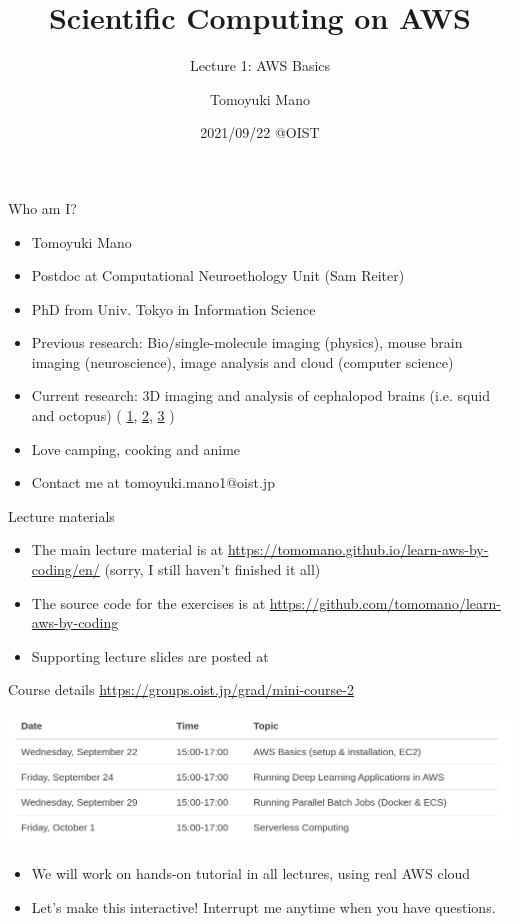 \documentclass[unicode,11pt]{beamer}
\title{Scientific Computing on AWS}
\subtitle{Lecture 1: AWS Basics}
\author{Tomoyuki Mano}
\institute[OIST]{Okinawa Institute of Science and Technology}
\date{2021/09/22 @OIST}
\begin{document}
\frame{\titlepage}

\begin{frame}{Who am I?}

\begin{itemize}
    \item Tomoyuki Mano
    \item Postdoc at Computational Neuroethology Unit (Sam Reiter)
    \item PhD from Univ. Tokyo in Information Science
    \item Previous research: Bio/single-molecule imaging (physics), mouse brain imaging (neuroscience), image analysis and cloud (computer science)
    \item Current research: 3D imaging and analysis of cephalopod brains (i.e. squid and octopus)
    (
    \href{https://twitter.com/CephWarden/status/1142083856893263872}{1},
    \href{https://twitter.com/CephWarden/status/1384644335069667334}{2},
    \href{https://twitter.com/CephWarden/status/1232307456346181632}{3}
    )
    \item Love camping, cooking and anime
    \item Contact me at tomoyuki.mano1@oist.jp
\end{itemize}
\end{frame}

\begin{frame}{Lecture materials}
\begin{itemize}
    \item The main lecture material is at
    \url{https://tomomano.github.io/learn-aws-by-coding/en/}
    (sorry, I still haven't finished it all)
    \item The source code for the exercises is at
    \url{https://github.com/tomomano/learn-aws-by-coding}
    \item Supporting lecture slides are posted at
\end{itemize}
\end{frame}

\begin{frame}{Course details}
\centering
\url{https://groups.oist.jp/grad/mini-course-2}

\vspace{10pt}

\includegraphics[width=1.0\textwidth]{imgs/schedule.png}

\begin{itemize}
    \item We will work on hands-on tutorial in all lectures, using real AWS cloud
    \item Let's make this interactive! Interrupt me anytime when you have questions.
\end{itemize}
\end{frame}
\end{document}

